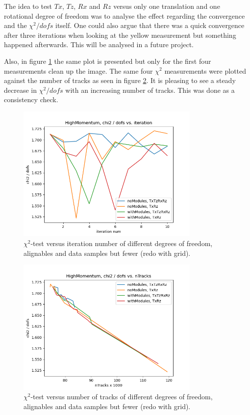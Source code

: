 The idea to test $Tx$, $Tz$, $Rx$ and $Rz$ versus only one translation and one
rotational degree of freedom was to analyse the effect regarding the convergence and the $\chi^2 / dofs$ itself. One could also argue that there was a quick convergence after three iterations when looking at the yellow measurement but something happened afterwards. This will be analysed in a future project.

Also, in figure \ref{fig:chi2iter} the same plot is presented but only for the first four measurements clean up the image. The same four $\chi^2$ measurements were plotted
against the number of tracks as seen in figure \ref{fig:chi2tracks}. It is pleasing to see a steady decrease in $\chi^2 / dofs$ with an increasing number of tracks. This was done as a consistency check.

\begin{figure}
  \centering
  \includegraphics[width=0.8\textwidth]{plots/nov_21/chi2_vs_iter_all.png}
  \caption{$\chi^2$-test versus iteration number of different degrees of freedom, alignables and data samples but fewer (redo with grid).}
  \label{fig:chi2iter}
\end{figure}

\begin{figure}
  \centering
  \includegraphics[width=0.8\textwidth]{plots/nov_21/chi2_vs_ntracks_all.png}
  \caption{$\chi^2$-test versus number of tracks of different degrees of freedom, alignables and data samples but fewer (redo with grid).}
  \label{fig:chi2tracks}
\end{figure}

